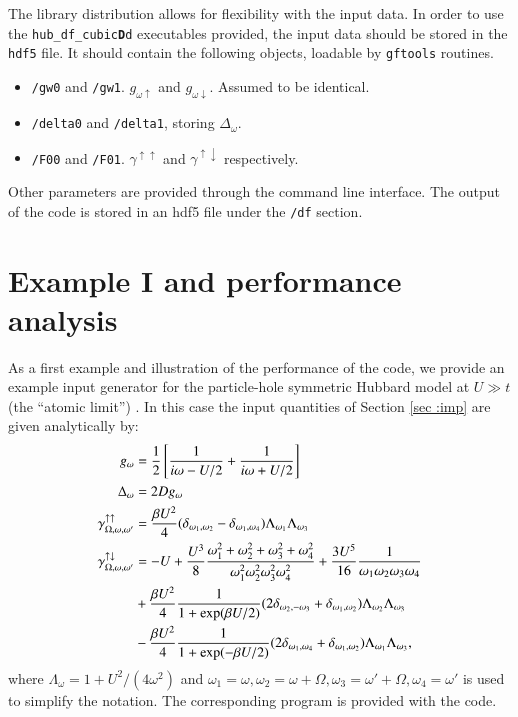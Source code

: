 \documentclass[3p,times,procedia]{elsarticle}
\begin{document}
The library distribution allows for flexibility with the input data. In order to use the \texttt{hub\_df\_cubic{\bf D}d} executables provided, the input data should be stored in the \texttt{hdf5} file. It should contain the following objects, loadable by \texttt{gftools} routines. 
\begin{itemize}
\item \texttt{/gw0} and \texttt{/gw1}. $g_{\omega \uparrow}$ and $g_{\omega \downarrow}$.  Assumed to be identical.
\item \texttt{/delta0} and \texttt{/delta1}, storing $\Delta_\omega$.
\item \texttt{/F00} and \texttt{/F01}. $\gamma^{\uparrow\uparrow}$ and $\gamma^{\uparrow\downarrow}$ respectively.
\end{itemize}
Other parameters are provided through the command line interface.
The output of the code is stored in an hdf5 file under the \texttt{/df} section.

\section{Example I and performance analysis}\label{sec:perf}
As a first example and illustration of the performance of the code, we provide an example input generator for the particle-hole symmetric Hubbard model at $U \gg t$ (the  ``atomic limit'') . In this case the input quantities of Section \ref{sec :imp} are  given analytically by:
\begin{align}\label{eq:atomic_limit1}
g_{\omega} & = \frac{1}{2}\left[\frac{1}{i\omega - U/2} + \frac{1}{i\omega + U/2}\right] \\
\Delta_{\omega} & = 2Dg_{\omega} \label{eq:atomic_limit2} \\ 
\gamma^{\uparrow\uparrow}_{\Omega,\omega,\omega'} & = \frac{\beta U^2}{4} (\delta_{\omega_1,\omega_2} - \delta_{\omega_1,\omega_4} ) \Lambda_{\omega_1}\Lambda_{\omega_3} \label{eq:atomic_limit3} \\ 
\label{eq:atomic_limit4}
\gamma^{\uparrow\downarrow}_{\Omega,\omega,\omega'} & = -U + 
\frac{U^3}{8}\frac{\omega_1^2 + \omega_2^2 + \omega_3^2 + \omega_4^2}{\omega_1^2\omega_2^2\omega_3^2\omega_4^2} + \frac{3U^5}{16}\frac{1}{\omega_1\omega_2\omega_3\omega_4}  \\
& \notag + \frac{\beta U^2}{4} \frac{1}{1 + \exp(\beta U /2 )} 
(2\delta_{ \omega_2, -\omega_3} + \delta_{\omega_1, \omega_2}) 
\Lambda_{\omega_2} \Lambda_{\omega_3}  \\ 
& \notag - \frac{\beta U^2}{4} \frac{1}{1 + \exp(-\beta U /2 )} 
(2\delta_{ \omega_1, \omega_4} + \delta_{\omega_1, \omega_2}) 
\Lambda_{\omega_1} \Lambda_{\omega_3},
\end{align}
where $\Lambda_\omega = 1 + U^2/(4\omega^2)$ and  $\omega_1 = \omega, \omega_2 = \omega + \Omega, \omega_3 = \omega' + \Omega, \omega_4 = \omega'$ is used to simplify the notation. The corresponding program is provided with the code. 
\end{document}
